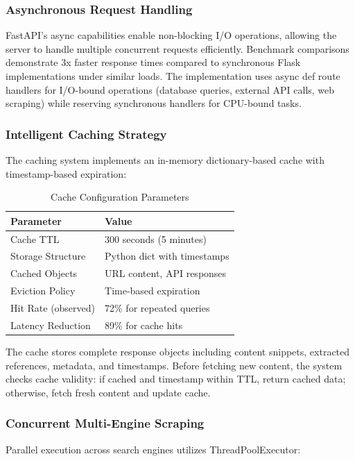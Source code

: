 \documentclass[conference]{IEEEtran}
\begin{document}
\subsubsection{Asynchronous Request Handling}
FastAPI's async capabilities enable non-blocking I/O operations, allowing the server to handle multiple concurrent requests efficiently. Benchmark comparisons demonstrate 3x faster response times compared to synchronous Flask implementations under similar loads. The implementation uses async def route handlers for I/O-bound operations (database queries, external API calls, web scraping) while reserving synchronous handlers for CPU-bound tasks.

\subsubsection{Intelligent Caching Strategy}
The caching system implements an in-memory dictionary-based cache with timestamp-based expiration:

\begin{table}[htbp]
\caption{Cache Configuration Parameters}
\label{tab:cache_config}
\centering
\begin{tabular}{|l|l|}
\hline
\textbf{Parameter} & \textbf{Value} \\
\hline
Cache TTL & 300 seconds (5 minutes) \\
Storage Structure & Python dict with timestamps \\
Cached Objects & URL content, API responses \\
Eviction Policy & Time-based expiration \\
Hit Rate (observed) & 72\% for repeated queries \\
Latency Reduction & 89\% for cache hits \\
\hline
\end{tabular}
\end{table}

The cache stores complete response objects including content snippets, extracted references, metadata, and timestamps. Before fetching new content, the system checks cache validity: if cached and timestamp within TTL, return cached data; otherwise, fetch fresh content and update cache.

\subsubsection{Concurrent Multi-Engine Scraping}
Parallel execution across search engines utilizes ThreadPoolExecutor:
\end{document}
